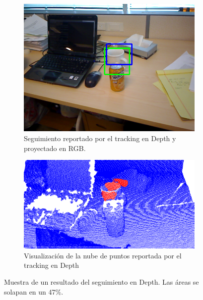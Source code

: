 \begin{figure}
	\centering
	\begin{subfigure}[b]{\textwidth}
		\includegraphics[width=\textwidth]{img/frame_98_taza_rgb.png}
		\caption{Seguimiento reportado por el tracking en Depth y proyectado en RGB.}
		\label{taza_ocluida_rgb}
	\end{subfigure}
	\quad
	\begin{subfigure}[b]{\textwidth}
		\includegraphics[width=\textwidth]{img/frame_98_taza_pcd.png}
		\caption{Visualización de la nube de puntos reportada por el tracking en Depth}
		\label{taza_ocluida_pcd}
	\end{subfigure}
	\caption{Muestra de un resultado del seguimiento en Depth. Las áreas se solapan en un 47\%.}
	\label{taza_ocluida}
\end{figure}


